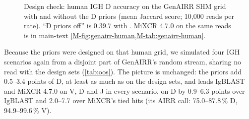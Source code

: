 \documentclass[11pt,a4paper]{article}
\begin{document}
\begin{figure}[t]
\centering
{}
\caption{Design check: human IGH D accuracy on the GenAIRR SHM grid with
and without the D priors (mean Jaccard score; 10,000 reads per rate).
``D priors off'' is \swig{} 0.39.7 with . MiXCR 4.7.0 on the same reads is in main-text
\cref{M-fig:genairr-human,M-tab:genairr-human}.}
\label{fig:dpriors}
\end{figure}

Because the priors were designed on that human grid, we simulated four IGH
scenarios again from a disjoint part of GenAIRR's random stream, sharing no
read with the design sets (\cref{tab:oos}). The picture is unchanged: the
priors add 0.5--3.4 points of D, at least as much as on the design sets, and
\swig{} leads IgBLAST and MiXCR 4.7.0 on V, D and J in every scenario, on D
by 0.9--6.3 points over IgBLAST and 2.0--7.7 over MiXCR's tied hits (its
AIRR call: 75.0--87.8\,\% D, 94.9--99.6\,\% V).
\end{document}
